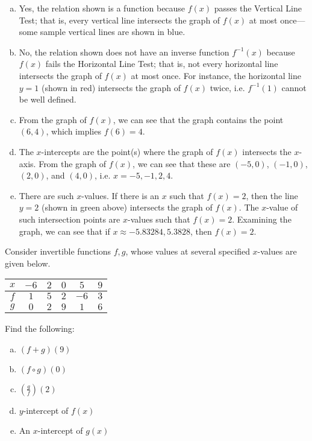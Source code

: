 \documentclass[12pt,letterpaper]{exam}
\begin{document}
\begin{questions}
\sol 
\begin{enumerate}[(a)]
\item Yes, the relation shown is a function because $f(x)$ passes the Vertical Line Test; that is, every vertical line intersects the graph of $f(x)$ at most once---some sample vertical lines are shown in blue. 

\item No, the relation shown does not have an inverse function $f^{-1}(x)$ because $f(x)$ fails the Horizontal Line Test; that is, not every horizontal line intersects the graph of $f(x)$ at most once. For instance, the horizontal line $y= 1$ (shown in red) intersects the graph of $f(x)$ twice, i.e. $f^{-1}(1)$ cannot be well defined. 

\item From the graph of $f(x)$, we can see that the graph contains the point $(6, 4)$, which implies $f(6)= 4$. 

\item The $x$-intercepts are the point(s) where the graph of $f(x)$ intersects the $x$-axis. From the graph of $f(x)$, we can see that these are $(-5, 0)$, $(-1, 0)$, $(2, 0)$, and $(4, 0)$, i.e. $x= -5, -1, 2, 4$. 
 
\item There are such $x$-values. If there is an $x$ such that $f(x)= 2$, then the line $y= 2$ (shown in green above) intersects the graph of $f(x)$. The $x$-value of such intersection points are $x$-values such that $f(x)= 2$. Examining the graph, we can see that if $x \approx -5.83284, 5.3828$, then $f(x)= 2$. 
\end{enumerate}



\newpage
\question[10] Consider invertible functions $f, g$, whose values at several specified $x$-values are given below. 
	\begin{table}[h]
	\centering
	\begin{tabular}{|c||c|c|c|c|c|} \hline
	$x$ & $-6$ & $2$ & $0$ & $5$ & $9$ \\ \hline
	$f$ & $1$ & $5$ & $2$ & $-6$ & $3$ \\ \hline
	$g$ & $0$ & $2$ & $9$ & $1$ & $6$ \\ \hline
	\end{tabular}
	\end{table}
Find the following:
	\begin{enumerate}[(a)]
	\item $(f + g)(9)$
	\item $(f \circ g)(0)$
	\item $\left( \frac{g}{f} \right)(2)$
	\item $y$-intercept of $f(x)$
	\item An $x$-intercept of $g(x)$
	\end{enumerate} \pspace


\end{questions}
\end{document}

